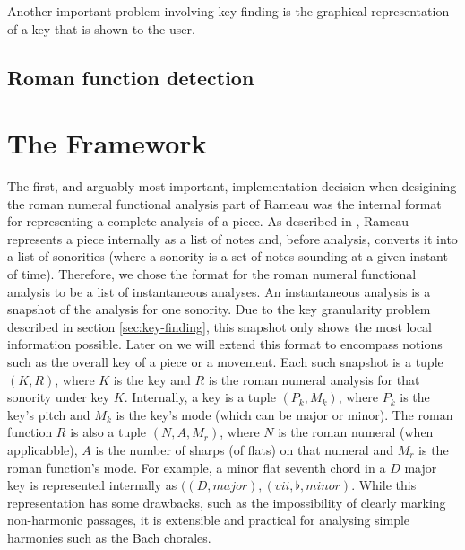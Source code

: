 
Another important problem involving key finding is the graphical
representation of a key that is shown to the user.

\subsection{Roman function detection}
\label{sec:roman-funct-detect}



\section{The Framework}
\label{sec:framework}


The first, and arguably most important, implementation decision when
desigining the roman numeral functional analysis part of Rameau was
the internal format for representing a complete analysis of a piece.
As described in \cite{kroger08:rameau}, Rameau represents a piece
internally as a list of notes and, before analysis, converts it into a
list of sonorities (where a sonority is a set of notes sounding at a
given instant of time).  Therefore, we
chose the format for the roman numeral functional analysis to be a
list of instantaneous analyses. An instantaneous analysis is a
snapshot of the analysis for one sonority. Due to the key granularity
problem described in section \ref{sec:key-finding}, this snapshot only
shows the most local information possible. Later on we will extend
this format to encompass notions such as the overall key of a piece or
a movement. Each such snapshot is a tuple $(K,R)$, where $K$ is the
key and $R$ is the roman numeral analysis for that sonority under key
$K$. Internally, a key is a tuple $(P_k,M_k)$, where $P_k$ is the
key's pitch and $M_k$ is the key's mode (which can be major or minor).
The roman function $R$ is also a tuple $(N,A,M_r)$, where $N$ is the
roman numeral (when applicabble), $A$ is the number of sharps (of
flats) on that numeral and $M_r$ is the roman function's mode. For
example, a minor flat seventh chord in a $D$ major key is represented
internally as $((D,major),(vii,\flat,minor)$. While this
representation has some drawbacks, such as the impossibility of
clearly marking non-harmonic passages, it is extensible and practical
for analysing simple harmonies such as the Bach chorales.

